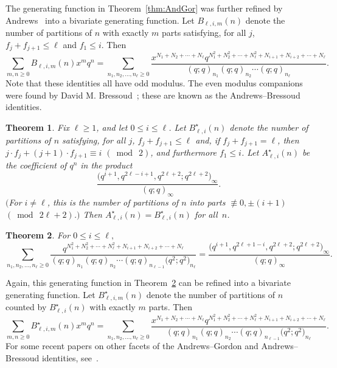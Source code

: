 \documentclass[10pt,a4paper]{amsart}
\numberwithin{equation}{section}
\newtheorem{Theorem}{Theorem}[section]
\theoremstyle{definition}
\begin{document}
The generating function in Theorem~\ref{thm:AndGor} was further refined by Andrews~\cite{AndPNAS} into a bivariate generating function. Let $B_{\ell,i,m}(n)$ denote the number of partitions of $n$ with exactly $m$ parts satisfying, for all $j$, $f_j + f_{j+1}\le \ell$ and $f_1 \le i$. Then
\begin{equation} \label{eq:AndGorxq}
\sum_{m,n \ge 0} B_{\ell,i,m}(n) x^m q^n =\sum_{n_1,n_2,\dots,n_{\ell}\ge 0} \frac{x^{N_1+N_2+\cdots+N_{\ell}}q^{N_1^2+N_2^2+\cdots+N_{\ell}^2+N_{i+1}+N_{i+2}+\cdots+N_{\ell}}}{(q;q)_{n_1}(q;q)_{n_2}\cdots(q;q)_{n_{\ell}}}.
\end{equation}
Note that these identities all have odd modulus. The even modulus companions were found by David M. Bressoud~\cite{Bress0,Bress1,Bress2}; these are known as the Andrews--Bressoud identities.
\begin{Theorem}
Fix $\ell\ge 1$, and let $0\le i\le \ell$. Let $B^\star_{\ell,i}(n)$ denote the number of partitions of $n$ satisfying, for all $j$, $f_j + f_{j+1}\le \ell$ and, if $f_j + f_{j+1}=\ell$, then $j\cdot f_j+(j+1)\cdot f_{j+1} \equiv i$ $(\bmod~2)$, and furthermore $f_1 \le i$. Let $A^\star_{\ell,i}(n)$ be the coefficient of $q^n$ in the product \[\frac{\bigl(q^{i+1},q^{2\ell-i+1},q^{2\ell+2};q^{2\ell+2}\bigr)_\infty}{(q;q)_\infty}.\] $($For $i\ne \ell$, this is the number of partitions of $n$ into parts $\not\equiv 0, \pm (i+1)$ $(\bmod~2\ell+2)$.$)$ Then $A^\star_{\ell,i}(n)=B^\star_{\ell,i}(n)$ for all~$n$.
\end{Theorem}


\begin{Theorem} \label{thm:AndBre}
For $0\le i \le \ell,$
\begin{equation*}
\sum_{n_1,n_2,\dots,n_{\ell}\ge 0} \frac{q^{N_1^2+N_2^2+\cdots+N_{\ell}^2+N_{i+1}+N_{i+2}+\cdots+N_{\ell}}}{(q;q)_{n_1}(q;q)_{n_2}\cdots(q;q)_{n_{\ell-1}}\bigl(q^2;q^2\bigr)_{n_{\ell}}} = \frac{\bigl(q^{i+1},q^{2\ell+1-i},q^{2\ell+2};q^{2\ell+2}\bigr)_\infty}{(q;q)_\infty}.
\end{equation*}
\end{Theorem}

Again, this generating function in Theorem~\ref{thm:AndBre} can be refined into a bivariate generating function. Let $B^\star_{\ell,i,m}(n)$ denote the number of partitions of $n$ counted by $B^\star_{\ell,i}(n)$ with exactly $m$ parts. Then
\begin{equation} \label{eq:AndBrexq}
\sum_{m,n \ge 0} B^\star_{\ell,i,m}(n) x^m q^n =\sum_{n_1,n_2,\dots,n_{\ell}\ge 0} \frac{x^{N_1+N_2+\cdots+N_{\ell}}q^{N_1^2+N_2^2+\cdots+N_{\ell}^2+N_{i+1}+N_{i+2}+\cdots+N_{\ell}}}{(q;q)_{n_1}(q;q)_{n_2}\cdots(q;q)_{n_{\ell-1}}\bigl(q^2;q^2\bigr)_{n_{\ell}}}.
\end{equation}
For some recent papers on other facets of the Andrews--Gordon and Andrews--Bressoud identities, see~\cite{ADJM,KLRS,KurParity,Stant,Wiecz}.
\end{document}
